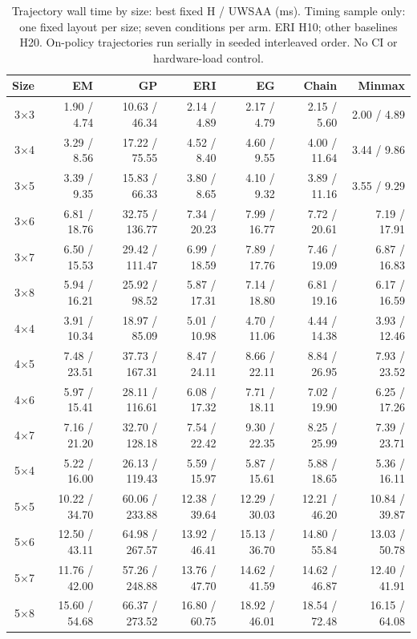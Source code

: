 \begin{table}[t]
\centering\scriptsize
\caption{Trajectory wall time by size: best fixed H / UWSAA (ms). Timing sample only: one fixed layout per size; seven conditions per arm. ERI H10; other baselines H20. On-policy trajectories run serially in seeded interleaved order. No CI or hardware-load control.}
\setlength{\tabcolsep}{4pt}
\begin{tabular}{rrrrrrr}
\toprule
Size & EM & GP & ERI & EG & Chain & Minmax \\
\midrule
3$\times$3 & 1.90 / 4.74 & 10.63 / 46.34 & 2.14 / 4.89 & 2.17 / 4.79 & 2.15 / 5.60 & 2.00 / 4.89 \\
3$\times$4 & 3.29 / 8.56 & 17.22 / 75.55 & 4.52 / 8.40 & 4.60 / 9.55 & 4.00 / 11.64 & 3.44 / 9.86 \\
3$\times$5 & 3.39 / 9.35 & 15.83 / 66.33 & 3.80 / 8.65 & 4.10 / 9.32 & 3.89 / 11.16 & 3.55 / 9.29 \\
3$\times$6 & 6.81 / 18.76 & 32.75 / 136.77 & 7.34 / 20.23 & 7.99 / 16.77 & 7.72 / 20.61 & 7.19 / 17.91 \\
3$\times$7 & 6.50 / 15.53 & 29.42 / 111.47 & 6.99 / 18.59 & 7.89 / 17.76 & 7.46 / 19.09 & 6.87 / 16.83 \\
3$\times$8 & 5.94 / 16.21 & 25.92 / 98.52 & 5.87 / 17.31 & 7.14 / 18.80 & 6.81 / 19.16 & 6.17 / 16.59 \\
4$\times$4 & 3.91 / 10.34 & 18.97 / 85.09 & 5.01 / 10.98 & 4.70 / 11.06 & 4.44 / 14.38 & 3.93 / 12.46 \\
4$\times$5 & 7.48 / 23.51 & 37.73 / 167.31 & 8.47 / 24.11 & 8.66 / 22.11 & 8.84 / 26.95 & 7.93 / 23.52 \\
4$\times$6 & 5.97 / 15.41 & 28.11 / 116.61 & 6.08 / 17.32 & 7.71 / 18.11 & 7.02 / 19.90 & 6.25 / 17.26 \\
4$\times$7 & 7.16 / 21.20 & 32.70 / 128.18 & 7.54 / 22.42 & 9.30 / 22.35 & 8.25 / 25.99 & 7.39 / 23.71 \\
5$\times$4 & 5.22 / 16.00 & 26.13 / 119.43 & 5.59 / 15.97 & 5.87 / 15.61 & 5.88 / 18.65 & 5.36 / 16.11 \\
5$\times$5 & 10.22 / 34.70 & 60.06 / 233.88 & 12.38 / 39.64 & 12.29 / 30.03 & 12.21 / 46.20 & 10.84 / 39.87 \\
5$\times$6 & 12.50 / 43.11 & 64.98 / 267.57 & 13.92 / 46.41 & 15.13 / 36.70 & 14.80 / 55.84 & 13.03 / 50.78 \\
5$\times$7 & 11.76 / 42.00 & 57.26 / 248.88 & 13.76 / 47.70 & 14.62 / 41.59 & 14.62 / 46.87 & 12.40 / 41.91 \\
5$\times$8 & 15.60 / 54.68 & 66.37 / 273.52 & 16.80 / 60.75 & 18.92 / 46.01 & 18.54 / 72.48 & 16.15 / 64.08 \\

\end{tabular}
\end{table}
